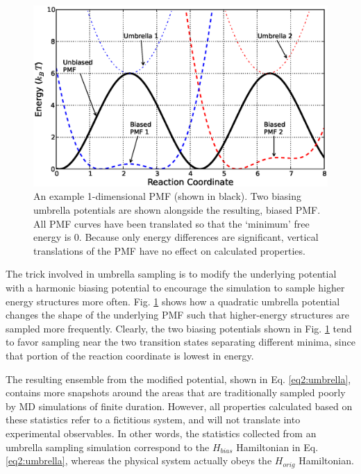 \begin{figure}
   \includegraphics[width=6.5in]{FreeEnergyProfile.ps}
   \caption{An example 1-dimensional PMF (shown in black). Two biasing umbrella
            potentials are shown alongside the resulting, biased PMF. All PMF
            curves have been translated so that the `minimum' free energy is 0.
            Because only energy differences are significant, vertical
            translations of the PMF have no effect on calculated properties.}
   \label{fig2:FreeEnergyProfile}
\end{figure}

The trick involved in umbrella sampling is to modify the underlying potential
with a harmonic biasing potential to encourage the simulation to sample higher
energy structures more often. Fig. \ref{fig2:FreeEnergyProfile} shows how a
quadratic umbrella potential changes the shape of the underlying PMF such that
higher-energy structures are sampled more frequently. Clearly, the two biasing
potentials shown in Fig. \ref{fig2:FreeEnergyProfile} tend to favor sampling
near the two transition states separating different minima, since that portion
of the reaction coordinate is lowest in energy.

The resulting ensemble from the modified potential, shown in Eq.
\ref{eq2:umbrella}, contains more snapshots around the areas that are
traditionally sampled poorly by MD simulations of finite duration. However, all
properties calculated based on these statistics refer to a fictitious system,
and will not translate into experimental observables. In other words, the
statistics collected from an umbrella sampling simulation correspond to the
$H_{bias}$ Hamiltonian in Eq. \ref{eq2:umbrella}, whereas the physical system
actually obeys the $H_{orig}$ Hamiltonian. \cite{Leach_Book_MolModel_2001}

